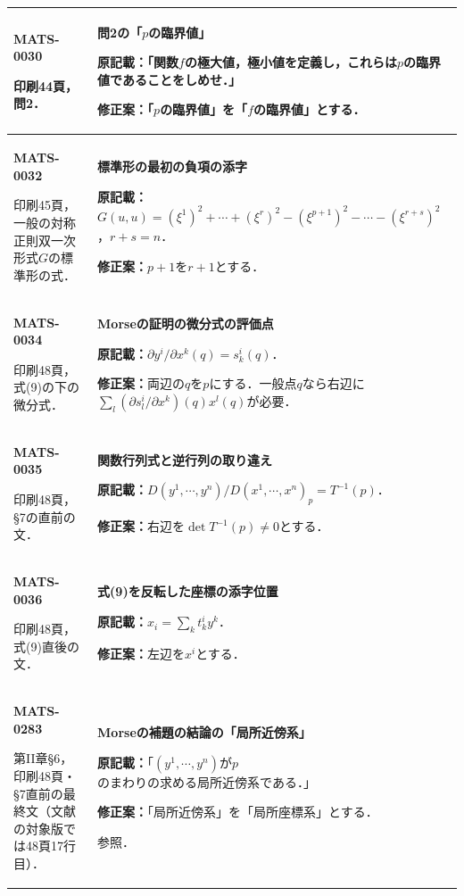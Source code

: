 \documentclass[a4paper,10pt]{ltjsarticle}
\begin{document}
\begin{longtable}{@{}>{\raggedright\arraybackslash}p{.19\linewidth}>{\raggedright\arraybackslash}p{.77\linewidth}@{}}
\hline
\hypertarget{MATS-0030}{}\textbf{MATS-0030}\par 印刷44頁，問2． & \textbf{問2の「$p$の臨界値」}\par\textbf{原記載：}「関数$f$の極大値，極小値を定義し，これらは$p$の臨界値であることをしめせ．」\par\textbf{修正案：}「$p$の臨界値」を「$f$の臨界値」とする． \\[3pt]
\hline
\hypertarget{MATS-0032}{}\textbf{MATS-0032}\par 印刷45頁，一般の対称正則双一次形式$G$の標準形の式． & \textbf{標準形の最初の負項の添字}\par\textbf{原記載：}$G(u,u)=(\xi^1)^2+\cdots+(\xi^r)^2-(\xi^{p+1})^2-\cdots-(\xi^{r+s})^2$，$r+s=n$．\par\textbf{修正案：}$p+1$を$r+1$とする． \\[3pt]
\hline
\hypertarget{MATS-0034}{}\textbf{MATS-0034}\par 印刷48頁，式(9)の下の微分式． & \textbf{Morseの証明の微分式の評価点}\par\textbf{原記載：}$\partial y^i/\partial x^k(q)=s^i_k(q)$．\par\textbf{修正案：}両辺の$q$を$p$にする．一般点$q$なら右辺に$\sum_l(\partial s^i_l/\partial x^k)(q)x^l(q)$が必要． \\[3pt]
\hline
\hypertarget{MATS-0035}{}\textbf{MATS-0035}\par 印刷48頁，\S7の直前の文． & \textbf{関数行列式と逆行列の取り違え}\par\textbf{原記載：}$D(y^1,\cdots,y^n)/D(x^1,\cdots,x^n)_p=T^{-1}(p)$．\par\textbf{修正案：}右辺を$\det T^{-1}(p)\ne0$とする． \\[3pt]
\hline
\hypertarget{MATS-0036}{}\textbf{MATS-0036}\par 印刷48頁，式(9)直後の文． & \textbf{式(9)を反転した座標の添字位置}\par\textbf{原記載：}$x_i=\sum_k t^i_k y^k$．\par\textbf{修正案：}左辺を$x^i$とする． \\[3pt]
\hline
\hypertarget{MATS-0283}{}\textbf{MATS-0283}\par 第II章\S6，印刷48頁・\S7直前の最終文（文献\cite{paper2017}の対象版では48頁17行目）． & \textbf{Morseの補題の結論の「局所近傍系」}\par\textbf{原記載：}「$(y^1,\cdots,y^n)$が$p$のまわりの求める局所近傍系である．」\par\textbf{修正案：}「局所近傍系」を「局所座標系」とする．\par\cite{paper2017}参照． \\[3pt]

\end{longtable}
\end{document}
